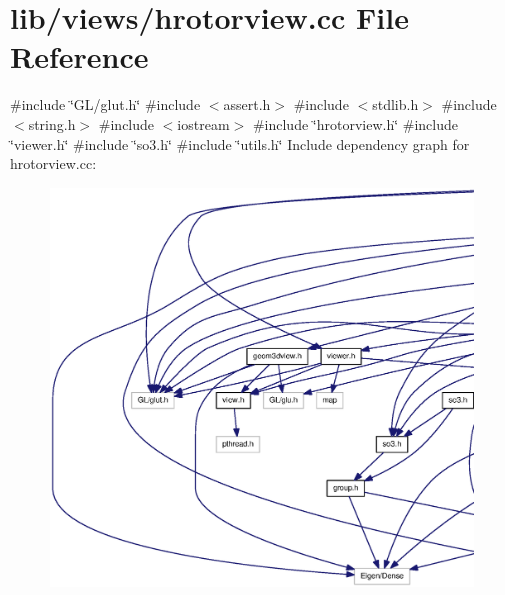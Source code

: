 \section{lib/views/hrotorview.cc \-File \-Reference}
\label{hrotorview_8cc}
{\ttfamily \#include \char`\"{}\-G\-L/glut.\-h\char`\"{}}\*
{\ttfamily \#include $<$assert.\-h$>$}\*
{\ttfamily \#include $<$stdlib.\-h$>$}\*
{\ttfamily \#include $<$string.\-h$>$}\*
{\ttfamily \#include $<$iostream$>$}\*
{\ttfamily \#include \char`\"{}hrotorview.\-h\char`\"{}}\*
{\ttfamily \#include \char`\"{}viewer.\-h\char`\"{}}\*
{\ttfamily \#include \char`\"{}so3.\-h\char`\"{}}\*
{\ttfamily \#include \char`\"{}utils.\-h\char`\"{}}\*
\-Include dependency graph for hrotorview.\-cc\-:
\nopagebreak
\begin{figure}[H]
\begin{center}
\leavevmode
\includegraphics[width=350pt]{hrotorview_8cc__incl}
\end{center}
\end{figure}
